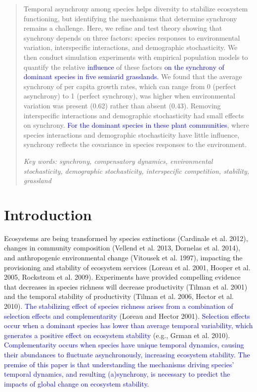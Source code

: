 \documentclass[11pt,]{article}
\begin{document}
\begin{abstract}
Temporal asynchrony among species helps diversity to stabilize ecosystem functioning, but identifying the mechanisms that determine synchrony remains a challenge.
Here, we refine and test theory showing that synchrony depends on three factors: species responses to environmental variation, interspecific interactions, and demographic stochasticity. We then conduct simulation experiments with empirical population models to quantify the relative \textcolor{blue}{influence} of these factors \textcolor{blue}{on the synchrony of dominant species in five semiarid grasslands.}
We found that the average synchrony of per capita growth rates, which can range from 0 (perfect asynchrony) to 1 (perfect synchrony), was higher when environmental variation was present (0.62) rather than absent (0.43).
Removing interspecific interactions and demographic stochasticity had small effects on synchrony. 
\textcolor{blue}{For the dominant species in these plant communities}, where species interactions and demographic stochasticity have little influence, synchrony reflects the covariance in species responses to the environment.

\vspace{1em}

\emph{Key words: synchrony, compensatory dynamics, environmental stochasticity, demographic stochasticity, interspecific competition, stability, grassland}

\end{abstract}

\setlength{\parindent}{5ex}

\section{Introduction}

Ecosystems are being transformed by species extinctions (Cardinale et
al. 2012), changes in community composition (Vellend et al. 2013,
Dornelas et al. 2014), and anthropogenic environmental change (Vitousek
et al. 1997), impacting the provisioning and stability of ecosystem
services (Loreau et al. 2001, Hooper et al. 2005, Rockstrom et al.
2009). Experiments have provided compelling evidence that decreases in
species richness will decrease productivity (Tilman et al. 2001) and the
temporal stability of productivity (Tilman et al. 2006, Hector et al.
2010).
\textcolor{blue}{The stabilizing effect of species richness arises from a combination of selection effects and complementarity}
(Loreau and Hector 2001).
\textcolor{blue}{Selection effects occur when a dominant species has lower than average temporal variability, which generates a positive effect on ecosystem stability}
(e.g., Grman et al. 2010).
\textcolor{blue}{Complementarity occurs when species have unique temporal dynamics, causing their abundances to fluctuate asynchronously, increasing ecosystem stability.}
\textcolor{blue}{The premise of this paper is that understanding the mechanisms driving species' temporal dynamics, and resulting (a)synchrony, is necessary to predict the impacts of global change on ecosystem stability.}
\end{document}
